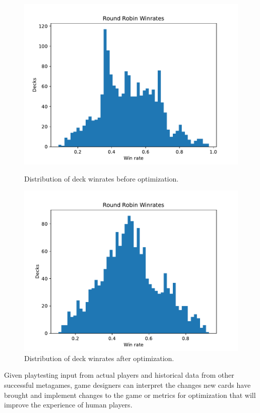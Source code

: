 \documentclass[letterpaper]{article} %
\begin{document}
\begin{figure}[t]
	\includegraphics[scale=0.5]{special_only_4_5_8_8_4_8_3_3_3_5}
	\caption{Distribution of deck winrates before optimization. }
	\label{fig:special_only_dist_before}

	\includegraphics[scale=0.5]{special_only_1_3_4_3_3_1_7_8_5_7}
	\caption{Distribution of deck winrates after optimization. }
	\label{fig:special_only_dist_after}
\end{figure}

Given playtesting input from actual players and historical data from other successful metagames, game designers can interpret the %
changes new cards have brought and implement changes to the game or metrics for optimization that will improve the experience of human players.
\end{document}
